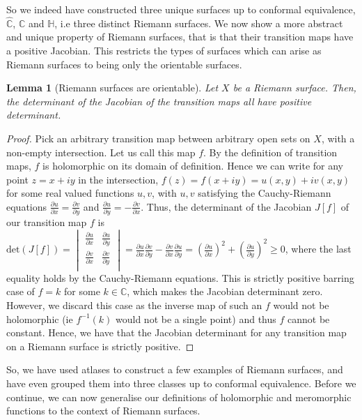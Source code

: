 \documentclass[11pt]{report}
\newtheorem{lemma}[thm]{Lemma}
\theoremstyle{definition}
\begin{document}
So we indeed have constructed three unique surfaces up to conformal equivalence, $\hat{\mathbb{C}}$, $\mathbb{C}$ and $\mathbb{H}$, i.e three distinct Riemann surfaces. We now show a more abstract and unique property of Riemann surfaces, that is that their transition maps have a positive Jacobian. This restricts the types of surfaces which can arise as Riemann surfaces to being only the orientable surfaces. 
\begin{lemma}[Riemann surfaces are orientable]
  Let $X$ be a Riemann surface. Then, the determinant of the Jacobian of the transition maps all have positive determinant.
\end{lemma}
\begin{proof}
  Pick an arbitrary transition map between arbitrary open sets on $X$, with a non-empty intersection. Let us call this map $f$. By the definition of transition maps, $f$ is holomorphic on its domain of definition. Hence we can write for any point $z=x+iy$ in the intersection, $f(z) = f(x+iy)=u(x,y)+iv(x,y)$ for some real valued functions $u,v$, with $u,v$ satisfying the Cauchy-Riemann equations $\frac{\partial u}{\partial x} = \frac{\partial v}{\partial y}$ and $\frac{\partial u}{\partial y} = -\frac{\partial v}{\partial x}$. 
  Thus, the determinant of the Jacobian $J[f]$ of our transition map $f$ is 
  $\text{det}(J[f])=\begin{vmatrix}
    \frac{\partial u}{\partial x} & \frac{\partial u}{\partial y} \\
    \frac{\partial v}{\partial x} & \frac{\partial v}{\partial y} \\
  \end{vmatrix} = \frac{\partial u}{\partial x}\frac{\partial v}{\partial y} -  \frac{\partial v}{\partial x}\frac{\partial u}{\partial y}= (\frac{\partial u}{\partial x})^2 + (\frac{\partial u}{\partial y})^2 \geq 0$, where the last equality holds by the Cauchy-Riemann equations. This is strictly positive barring case of $f=k$ for some $k\in \mathbb{C}$, which makes the Jacobian determinant zero. However, we discard this case as the inverse map of such an $f$ would not be holomorphic (ie $f^{-1}(k)$ would not be a single point) and thus $f$ cannot be constant. Hence, we have that the Jacobian determinant for any transition map on a Riemann surface is strictly positive.
\end{proof}

So, we have used atlases to construct a few examples of Riemann surfaces, and have even grouped them into three classes up to conformal equivalence.
Before we continue, we can now generalise our definitions of holomorphic and meromorphic functions to the context of Riemann surfaces.
\end{document}
